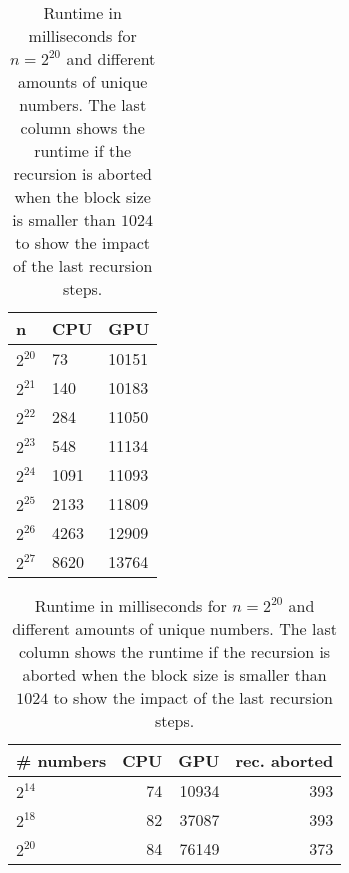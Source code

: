 \documentclass{llncs}
\begin{document}
\begin{table}
\parbox{.45\linewidth}{
\centering

\begin{tabular}{@{}lll@{}}
\toprule
n         & CPU  & GPU   \\ \midrule
$2^{20}$    & 73   & 10151 \\
$2^{21}$    & 140  & 10183 \\
$2^{22}$   & 284  & 11050 \\
$2^{23}$    & 548  & 11134 \\
$2^{24}$  & 1091 & 11093 \\
$2^{25}$   & 2133 & 11809 \\
$2^{26}$   & 4263 & 12909 \\
$2^{27}$ & 8620 & 13764 \\ \bottomrule
\end{tabular}
\caption{Runtime in milliseconds of the Quick Sort algorithm with $2^{14}$ different numbers.}
\label{tbl:input_size}
}
\hfill
\parbox{.45\linewidth}{
\centering
\begin{tabular}{@{}lrrr@{}}
\toprule
\# numbers       & CPU & GPU   & rec. aborted    \\ \midrule
$2^{14}$   & 74  & 10934 & 393 \\
$2^{18}$  & 82  & 37087 & 393 \\
$2^{20}$ & 84  & 76149 & 373 \\ \bottomrule
\end{tabular}
\caption{Runtime in milliseconds for $n=2^{20}$ and different amounts of unique numbers. The last column shows the runtime if the recursion is aborted when the block size is smaller than $1024$ to show the impact of the last recursion steps.}
\label{tbl:unique_numbers}
}
\end{table}




\end{document}

